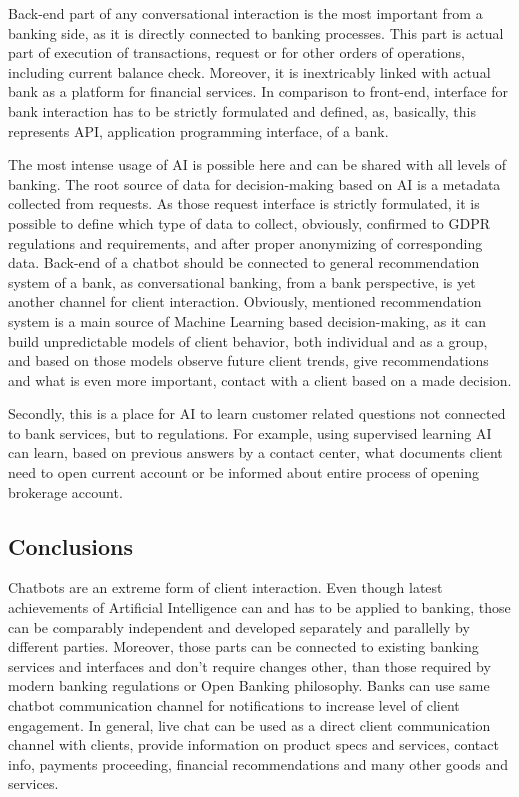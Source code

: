 Back-end part of any conversational interaction is the most important from a banking side, as it is directly connected to banking processes.
This part is actual part of execution of transactions, request or for other orders of operations, including current balance check.
Moreover, it is inextricably linked with actual bank as a platform for financial services.
In comparison to front-end, interface for bank interaction has to be strictly formulated and defined, as, basically, this represents API, application programming interface, of a bank.

The most intense usage of AI is possible here and can be shared with all levels of banking.
The root source of data for decision-making based on AI is a metadata collected from requests.
As those request interface is strictly formulated, it is possible to define which type of data to collect, obviously, confirmed to GDPR regulations and requirements, and after proper anonymizing of corresponding data.
Back-end of a chatbot should be connected to general recommendation system of a bank, as conversational banking, from a bank perspective, is yet another channel for client interaction.
Obviously, mentioned recommendation system is a main source of Machine Learning based decision-making, as it can build unpredictable models of client behavior, both individual and as a group, and based on those models observe future client trends, give recommendations and what is even more important, contact with a client based on a made decision.

Secondly, this is a place for AI to learn customer related questions not connected to bank services, but to regulations.
For example, using supervised learning AI can learn, based on previous answers by a contact center, what documents client need to open current account or be informed about entire process of opening brokerage account.



\subsection*{Conclusions}

Chatbots are an extreme form of client interaction.
Even though latest achievements of Artificial Intelligence can and has to be applied to banking, those can be comparably independent and developed separately and parallelly by different parties.
Moreover, those parts can be connected to existing banking services and interfaces and don't require changes other, than those required by modern banking regulations or Open Banking philosophy.
Banks can use same chatbot communication channel for notifications to increase level of client engagement.
In general, live chat can be used as a direct client communication channel with clients, provide information on product specs and services, contact info, payments proceeding, financial recommendations and many other goods and services.

